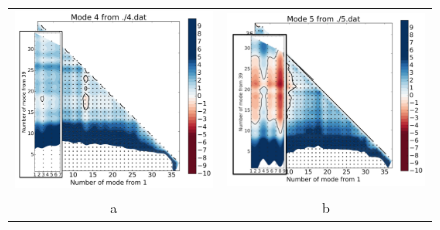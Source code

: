 	
	
	\begin{figure}[H]
		\begin{center}
			\begin{tabular}{c c}
				\includegraphics[scale=0.2]{image/image/P1-41} & \includegraphics[scale=0.2]{image/image/P1-42}\\
				a & b\\

\end{tabular}
\end{center}
\end{figure}
